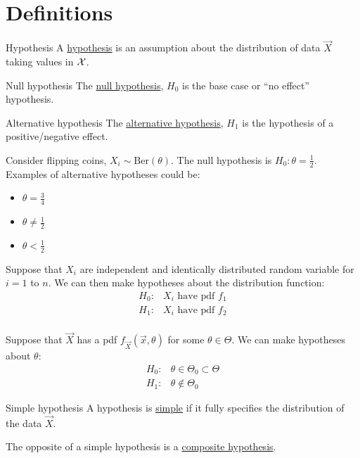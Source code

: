 \documentclass[../Main.tex]{subfiles}
\begin{document}
\section{Definitions}
\begin{definition}{Hypothesis}
    A \underline{hypothesis} is an assumption about the distribution of data $\vec{X}$ taking values in $\mathcal{X}$.
\end{definition}
\begin{definition}{Null hypothesis}
    The \underline{null hypothesis}, $H_0$ is the base case or ``no effect'' hypothesis.
\end{definition}
\begin{definition}{Alternative hypothesis}
    The \underline{alternative hypothesis}, $H_1$ is the hypothesis of a positive/negative effect.
\end{definition}
\begin{example}
    Consider flipping coins, $X_i \sim \text{Ber}(\theta)$. The null hypothesis is $H_0 : \theta = \frac12$. Examples of alternative hypotheses could be:
    \begin{itemize}
        \item $\theta = \frac34$
        \item $\theta \neq \frac12$
        \item $\theta < \frac12$
    \end{itemize}
\end{example}
\begin{example}
    Suppose that $X_i$ are independent and identically distributed random variable for $i = 1$ to $n$.
    We can then make hypotheses about the distribution function:
    \begin{align*}
        H_0:&X_i \text{ have pdf } f_1 \\
        H_1:&X_i \text{ have pdf } f_2 \\
    \end{align*}
\end{example}
\begin{example}
    Suppose that $\vec{X}$ has a pdf $f_{\vec{X}}(\vec{x}, \theta)$ for some $\theta \in \Theta$. We can make hypotheses about $\theta$:
    \begin{align*}
        H_0:&\theta \in \Theta_0 \subset \Theta \\
        H_1:&\theta \notin \Theta_0
    \end{align*}
\end{example}
\begin{definition}{Simple hypothesis}
    A hypothesis is \underline{simple} if it fully specifies the distribution of the data $\vec{X}$.

    The opposite of a simple hypothesis is a \underline{composite hypothesis}.
\end{definition}
\end{document}
